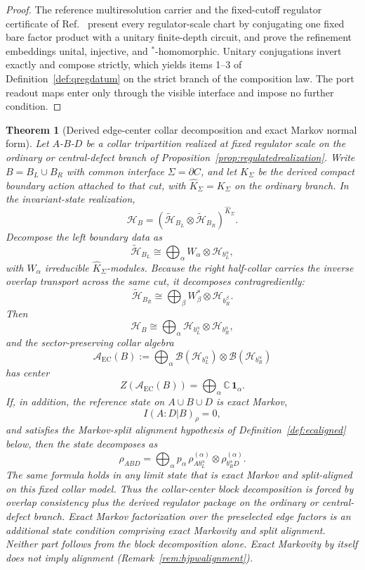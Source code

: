 \documentclass[11pt]{article}
\newtheorem{theorem}{Theorem}[section]
\begin{document}
\begin{proof}
The reference multiresolution carrier and the fixed-cutoff regulator certificate of Ref.~\cite{ophmicrophysics} present every regulator-scale chart by conjugating one fixed bare factor product with a unitary finite-depth circuit, and prove the refinement embeddings unital, injective, and \(^*\)-homomorphic. Unitary conjugations invert exactly and compose strictly, which yields items 1--3 of Definition~\ref{def:qregdatum} on the strict branch of the composition law. The port readout maps enter only through the visible interface and impose no further condition.
\end{proof}

\begin{theorem}[Derived edge-center collar decomposition and exact Markov normal form]\label{thm:markovcollar}
Let \(A\)-\(B\)-\(D\) be a collar tripartition realized at fixed regulator scale on the ordinary or central-defect branch of Proposition~\ref{prop:regulatedrealization}. Write \(B=B_L\cup B_R\) with common interface \(\Sigma=\partial C\), and let \(\widehat K_\Sigma\) be the derived compact boundary action attached to that cut, with \(\widehat K_\Sigma=K_\Sigma\) on the ordinary branch. In the invariant-state realization,
\[
\mathcal H_B=(\tilde{\mathcal H}_{B_L}\otimes \tilde{\mathcal H}_{B_R})^{\widehat K_\Sigma}.
\]
Decompose the left boundary data as
\[
\tilde{\mathcal H}_{B_L}\cong \bigoplus_\alpha W_\alpha\otimes \mathcal H_{b_L^\alpha},
\]
with \(W_\alpha\) irreducible \(\widehat K_\Sigma\)-modules. Because the right half-collar carries the inverse overlap transport across the same cut, it decomposes contragrediently:
\[
\tilde{\mathcal H}_{B_R}\cong \bigoplus_\beta W_\beta^*\otimes \mathcal H_{b_R^\beta}.
\]
Then
\[
\mathcal H_B\cong\bigoplus_\alpha \mathcal H_{b_L^\alpha}\otimes \mathcal H_{b_R^\alpha},
\]
and the sector-preserving collar algebra
\[
\mathcal A_{\mathrm{EC}}(B):=\bigoplus_\alpha \mathcal B(\mathcal H_{b_L^\alpha})\otimes \mathcal B(\mathcal H_{b_R^\alpha})
\]
has center
\[
Z(\mathcal A_{\mathrm{EC}}(B))=\bigoplus_\alpha \mathbb C\,\mathbf 1_\alpha.
\]
If, in addition, the reference state on \(A\cup B\cup D\) is exact Markov,
\[
I(A:D|B)_\rho=0,
\]
and satisfies the Markov-split alignment hypothesis of Definition~\ref{def:ecaligned} below, then the state decomposes as
\[
\rho_{ABD}
=
\bigoplus_\alpha p_\alpha\,
\rho^{(\alpha)}_{A b_L^\alpha}\otimes \rho^{(\alpha)}_{b_R^\alpha D}.
\]
The same formula holds in any limit state that is exact Markov and split-aligned on this fixed collar model.
Thus the collar-center block decomposition is forced by overlap consistency plus the derived regulator package on the ordinary or central-defect branch. Exact Markov factorization over the preselected edge factors is an additional state condition comprising exact Markovity and split alignment. Neither part follows from the block decomposition alone. Exact Markovity by itself does not imply alignment (Remark~\ref{rem:hjpwalignment}).
\end{theorem}
\end{document}

